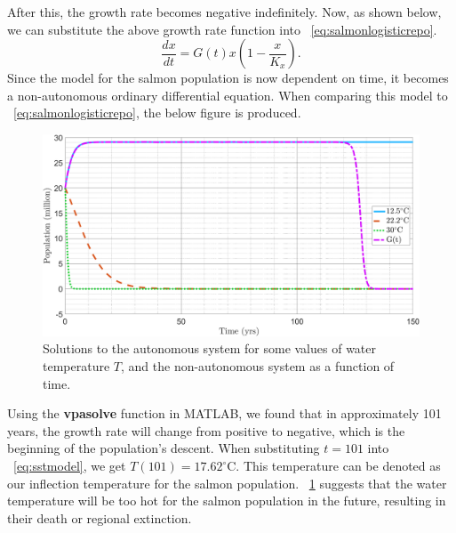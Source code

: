 After this, the growth rate becomes negative indefinitely.
Now, as shown below, we can substitute the above growth rate function into \equationautorefname~\eqref{eq:salmonlogisticrepo}.
\begin{equation}\label{eq:SalmonLogTime}
    \frac{dx}{dt} = G(t)x\left(1-\frac{x}{K_x}\right).
\end{equation}
Since the model for the salmon population is now dependent on time, it becomes a non-autonomous ordinary differential equation. When comparing this model to \equationautorefname~\eqref{eq:salmonlogisticrepo}, the below figure is produced.
\begin{figure}[H]
    \centering
    \includegraphics[width=14cm]{Pictures/Salmon Pop/salmon repo model/SalmonWithRepoFun.png}
    \caption{\singlespacing
    Solutions to the autonomous system for some values of water temperature $T$, and the non-autonomous system as a function of time.
    }
    \label{fig:SalmonWithRepoFun}
\end{figure}
Using the \textbf{vpasolve} function in MATLAB, we found that in approximately 101 years, the growth rate will change from positive to negative, which is the beginning of the population's descent.
When substituting $t=101$ into \equationautorefname~\eqref{eq:sstmodel}, we get $T(101) = 17.62^{\circ}$C.
This temperature can be denoted as our inflection temperature for the salmon population.
\figureautorefname~\ref{fig:SalmonWithRepoFun} suggests that the water temperature will be too hot for the salmon population in the future, resulting in their death or regional extinction.



